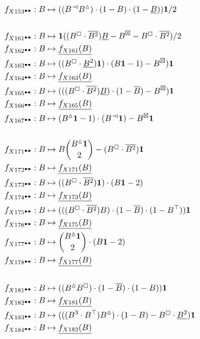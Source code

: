 \documentclass{article}
\theoremstyle{plain}
\begin{document}
\begin{align*}
f_{X153^\dumbbell}: B&\mapsto ((B^\arro B^\vartriangle)\cdot(1-B)\cdot(1-\underline{B})){\bf 1}/2\\
&\\%
f_{X161^\dumbbell}: B&\mapsto {\bf 1}((B^\boxempty\cdot\overline{B^2})\underline{B}-B^\boxtimes-B^\boxempty\cdot\overline{B^2})/2\\
f_{X162^\dumbbell}: B&\mapsto \underline{f_{X161}(B)}\\
f_{X163^\dumbbell}: B&\mapsto ((B^\boxempty\cdot\underline{B^2}){\bf 1})\cdot(B{\bf 1}-1)-B^\boxtimes){\bf 1}\\
f_{X164^\dumbbell}: B&\mapsto \underline{f_{X163}(B)}\\
f_{X165^\dumbbell}: B&\mapsto (((B^\boxempty\cdot\overline{B^2})\underline{B})\cdot(1-\overline{B})-B^\boxtimes){\bf 1}\\
f_{X166^\dumbbell}: B&\mapsto \underline{f_{X165}(B)}\\
f_{X167^\dumbbell}: B&\mapsto (B^\vartriangle{\bf 1}-1)\cdot (B^\arro{\bf 1})-B^\boxtimes{\bf 1}\\
&\\%
f_{X171^\dumbbell}: B&\mapsto B \binom{B^\vartriangle{\bf 1}}{2}-(B^\boxempty\cdot\overline{B^2}){\bf 1}\\
f_{X172^\dumbbell}: B&\mapsto \underline{f_{X171}(B)}\\
f_{X173^\dumbbell}: B&\mapsto ((B^\boxempty\cdot\overline{B^2}){\bf 1})\cdot(B{\bf 1}-2)\\
f_{X174^\dumbbell}: B&\mapsto \underline{f_{X173}(B)}\\
f_{X175^\dumbbell}: B&\mapsto (((B^\boxempty\cdot\overline{B^2})B)\cdot(1-\overline{B})\cdot(1-B^\top)){\bf 1}\\
f_{X176^\dumbbell}: B&\mapsto \underline{f_{X175}(B)}\\
f_{X177^\dumbbell}: B&\mapsto \binom{B^\vartriangle{\bf 1}}{2}\cdot(B{\bf 1}-2)\\
f_{X178^\dumbbell}: B&\mapsto \underline{f_{X177}(B)}\\
&\\%
f_{X181^\dumbbell}: B&\mapsto ((B^\vartriangle B^\boxempty)\cdot(1-\overline{B})\cdot(1-B)){\bf 1}\\
f_{X182^\dumbbell}: B&\mapsto \underline{f_{X181}(B)}\\
f_{X183^\dumbbell}: B&\mapsto (((B^3\cdot B^\top)B^\vartriangle)\cdot(1-B)-B^\boxempty\cdot\underline{B^2}){\bf 1}\\
f_{X184^\dumbbell}: B&\mapsto \underline{f_{X183}(B)}\\

\end{align*}
\end{document}
